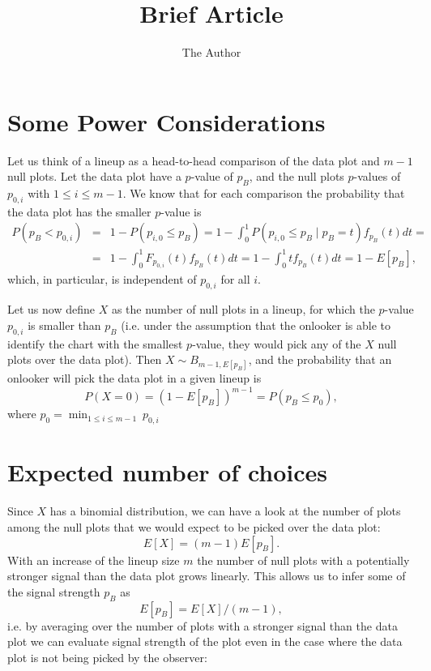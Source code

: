 \documentclass[11pt]{article}
\title{Brief Article}
\author{The Author}
\begin{document}
\section{Some Power Considerations}

Let us think of a lineup as a head-to-head comparison of the data plot and $m-1$ null plots. Let the data plot have a $p$-value of $p_B$, and the null plots $p$-values of $p_{0, i}$ with $1 \le i \le m-1$.
We know that for each comparison the probability that the data plot has the smaller $p$-value is 
\begin{eqnarray*}
P(p_B < p_{0,i}) &=& 1 - P(p_{i,0} \le p_B) = 1- \int_0^1  P(p_{i,0} \le p_B \mid p_B=t) f_{p_B}(t) dt =  \\
&=& 1 - \int_0^1 F_{p_{0,i}}(t) f_{p_B}(t) dt = 1 - \int_0^1 t f_{p_B}(t) dt = 1 - E[p_B],
\end{eqnarray*}
which, in particular, is independent of $p_{0,i}$ for all $i$.

Let us now define $X$ as the number of null plots in a lineup, for which the $p$-value $p_{0,i}$ is smaller than $p_B$ (i.e. under the assumption that the onlooker is able to identify the chart with the smallest $p$-value, they would pick any of the $X$  null plots over the data plot). 
Then $X \sim B_{m-1, E[p_B]}$, and the probability that an onlooker will pick the data plot in a given lineup is 
\begin{equation}\label{p0}
P(X=0) = \left(1 - E[p_B] \right)^{m-1} = P(p_B \le p_0),
\end{equation}
where $p_0 = \min_{1 \le i \le m-1}  \ p_{0,i}$

\section{Expected number of choices}
Since $X$ has a binomial distribution, we can have a look at the number of plots among the null plots that we would expect to be picked over the data plot:
\[
E[X] = (m-1)E[p_B].
\]
With an increase of the lineup size $m$ the number of null plots with a potentially stronger signal than the data plot grows linearly.
This allows us to infer some of the signal strength $p_B$ as
\[
E[p_B] = E[X]/(m-1),
\]
i.e. by averaging over the number of plots with  a stronger signal than the data plot we can evaluate signal strength of the plot even in the case where the data plot is not being picked by the observer:
\end{document}
